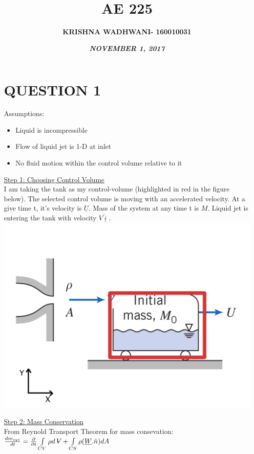 \documentclass{article}
\title{\textbf{\Huge AE 225}}
\author{\textbf{\Huge KRISHNA WADHWANI- 160010031} }
\date{\textbf{\huge \textit{NOVEMBER 1, 2017}}}
\newcommand{\volume}{\mathop{\ooalign{\hfil$V$\hfil\cr\kern0.08em--\hfil\cr}}\nolimits}
\begin{document}
\maketitle
\bigbreak
\bigbreak
\bigbreak

\section{\Large QUESTION 1}

Assumptions: 
\begin{itemize}
    \item Liquid is incompressible
    \item Flow of liquid jet is 1-D at inlet
    \item No fluid motion within the control volume relative to it
\end{itemize}

\noindent \underline{Step 1: Choosing Control Volume}\\

\noindent I am taking the tank as my control-volume (highlighted in red in the figure below). The selected control volume is moving with an accelerated velocity. At a give time t, it's velocity is $\underline{U}$. Mass of the system at any time t is $M$. Liquid jet is entering the tank with velocity $V \ \hat{\underline{i}}$ .\\
\includegraphics[scale=0.6]{225q12.png}

\noindent \underline{Step 2: Mass Conservation}\\

\noindent From Reynold Transport Theorem for mass consevation:\ 
$\frac{dm_{sys}}{dt}= \frac{\partial}{\partial t} \int\limits_{CV} \rho d\volume + \int\limits_{CS} \rho (\underline{W}.\hat{n})dA $
\end{document}
